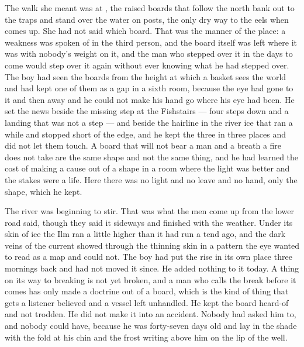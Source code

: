 The walk she meant was  at , the raised boards that follow the north bank out to the traps and stand over the water on posts, the only dry way to the eels when  comes up. She had not said which board. That was the manner of the place: a weakness was spoken of in the third person, and the board itself was left where it was with nobody's weight on it, and the man who stepped over it in the days to come would step over it again without ever knowing what he had stepped over. The boy had seen the boards from the height at which a basket sees the world and had kept one of them as a gap in a sixth room, because the eye had gone to it and then away and he could not make his hand go where his eye had been. He set the news beside the missing step at the Fishstairs --- four steps down and a landing that was not a step --- and beside the hairline in the river ice that ran a while and stopped short of the edge, and he kept the three in three places and did not let them touch. A board that will not bear a man and a breath a fire does not take are the same shape and not the same thing, and he had learned the cost of making a cause out of a shape in a room where the light was better and the stakes were a life. Here there was no light and no leave and no hand, only the shape, which he kept.

The river was beginning to stir. That was what the men come up from the lower road said, though they said it sideways and finished with the weather. Under its skin of ice the Ilm ran a little higher than it had run a tend ago, and the dark veins of the current showed through the thinning skin in a pattern the eye wanted to read as a map and could not. The boy had put the rise in its own place three mornings back and had not moved it since. He added nothing to it today. A thing on its way to breaking is not yet broken, and a man who calls the break before it comes has only made a doctrine out of a board, which is the kind of thing that gets a listener believed and a vessel left unhandled. He kept the board heard-of and not trodden. He did not make it into an accident. Nobody had asked him to, and nobody could have, because he was forty-seven days old and lay in the shade with the fold at his chin and the frost writing above him on the lip of the well.

\scenebreak

